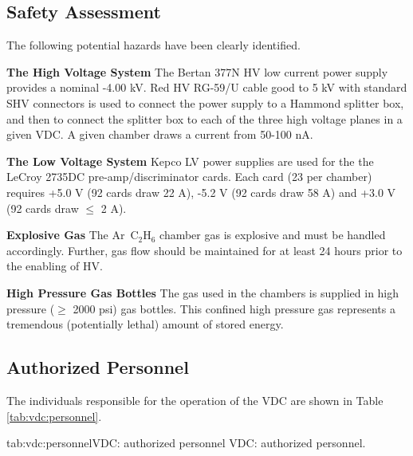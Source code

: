 \begin{safetyen}{5}{5}
\section{Safety Assessment}
The following potential hazards have been clearly identified.
\begin{description}
\item {\bf The High Voltage System}
The Bertan 377N HV low current power supply provides a nominal
-4.00 kV.  Red HV RG-59/U cable good to 5 kV with standard SHV
connectors is used to connect the power supply to a Hammond splitter
box, and then to connect the splitter box to each of the three high
voltage planes in a given VDC.  A given chamber draws a current
from  50-100 nA.
\item {\bf The Low Voltage System}
Kepco LV power supplies are used for the the LeCroy 2735DC
pre-amp/discriminator cards.  Each card (23 per chamber) requires
+5.0 V (92 cards draw 22 A), -5.2 V (92 cards draw 58 A) and +3.0 V
(92 cards draw $\leq$ 2 A).
\item{\bf Explosive Gas} The Ar~C$_2$H$_6$ chamber gas is explosive
and must be handled accordingly.  Further, gas flow should be maintained
for at least 24 hours prior to the enabling of HV.
\item{\bf High Pressure Gas Bottles} The gas used in the chambers
is supplied in high pressure ($\ge$ 2000 psi) gas bottles. This
confined high pressure gas represents a tremendous (potentially lethal)
amount of stored energy.
\end{description}
\end{safetyen}

\begin{safetyen}{10}{15}
\section{Authorized Personnel}
\end{safetyen}

The individuals responsible for the operation 
of the VDC are shown in Table \ref{tab:vdc:personnel}.

\begin{namestab}{tab:vdc:personnel}{VDC: authorized personnel}{%
      VDC: authorized personnel.}
  \BogdanWojtsekhowski{}
\end{namestab}


%
%
%
%
%
%
%
